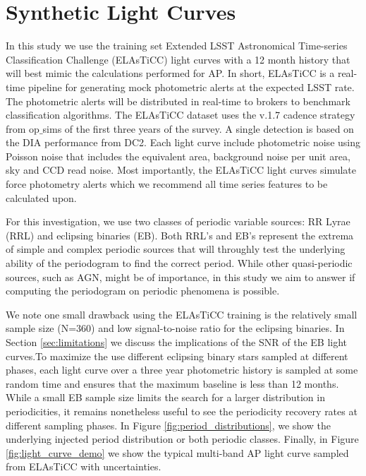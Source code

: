 \documentclass[DM,authoryear,toc]{lsstdoc}
\begin{document}
\section{Synthetic Light Curves}
In this study we use the training set Extended LSST Astronomical Time-series Classification Challenge (ELAsTiCC) light curves with a 12 month history that will best mimic the calculations performed for AP. In short, ELAsTiCC is a real-time pipeline for generating mock photometric alerts at the expected LSST rate. The photometric alerts will be distributed in real-time to brokers to benchmark classification algorithms. The ELAsTiCC dataset uses the v.1.7 cadence strategy from op$\_$sims of the first three years of the survey. A single detection is based on the DIA performance from DC2. Each light curve include photometric noise using Poisson noise that includes the equivalent area, background noise per unit area, sky and CCD read noise. Most importantly, the ELAsTiCC light curves simulate force photometry alerts which we recommend all time series features to be calculated upon. 
	
For this investigation, we use two classes of periodic variable sources: RR Lyrae (RRL) and eclipsing binaries (EB). Both RRL's and EB's represent the extrema of simple and complex periodic sources that will throughly test the underlying ability of the periodogram to find the correct period. While other quasi-periodic sources, such as AGN, might be of importance, in this study we aim to answer if computing the periodogram on periodic phenomena is possible.  

We note one small drawback using the ELAsTiCC training is the relatively small sample size (N=360) and low signal-to-noise ratio for the eclipsing binaries. In Section \ref{sec:limitations} we discuss the implications of the SNR of the EB light curves.To maximize the use different eclipsing binary stars sampled at different phases, each light curve over a three year photometric history is sampled at some random time and ensures that the maximum baseline is less than 12 months. While a small EB sample size limits the search for a larger distribution in periodicities, it remains nonetheless useful to see the periodicity recovery rates at different sampling phases. In Figure \ref{fig:period_distributions}, we show the underlying injected period distribution or both periodic classes. Finally, in Figure \ref{fig:light_curve_demo} we show the typical multi-band AP light curve sampled from ELAsTiCC with uncertainties.
\end{document}
